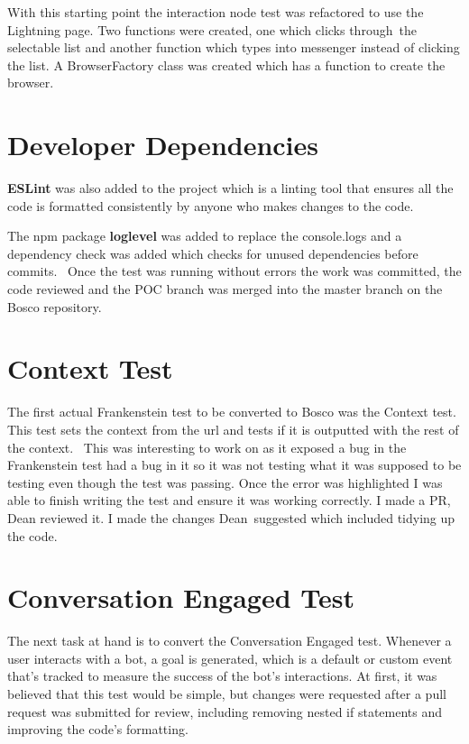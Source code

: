 \documentclass[12pt,a4paper,titlepage]{report}
\begin{document}
With this starting point the interaction node test was refactored to use the Lightning page. Two functions were
created, one which clicks through the selectable list and another function which types into messenger instead of
clicking the list. A BrowserFactory class was created which has a function to create the browser.

\section{Developer Dependencies}
\textbf {ESLint} was also added to the project which is a linting tool that ensures all the code is formatted consistently
by anyone who makes changes to the code.  

The npm package \textbf {loglevel} was added to replace the console.logs and a dependency check
was added which checks for unused dependencies before commits.  Once the test was running without errors the work
was committed, the code reviewed and the POC branch was merged into the master branch on the Bosco repository.


\section{Context Test}
The first actual Frankenstein test to be converted to Bosco was the Context test. This test sets the context from the url
and tests if it is outputted with the rest of the context.  This was interesting to work on as it exposed a bug in the Frankenstein test had a bug in it so it was not testing what it was supposed to be
testing even though the test was passing. Once the error was highlighted I was able to finish writing the test
and ensure it was working correctly. I made a PR, Dean reviewed it. I made the changes Dean suggested which
included tidying up the code.

\section{Conversation Engaged Test}
The next task at hand is to convert the Conversation Engaged test. Whenever a user interacts with a bot, a goal is generated, which is a default or custom event that's tracked to measure the success of the bot's interactions.
At first, it was believed that this test would be simple, but changes were requested after a pull request was submitted for review, including removing nested if statements and improving the code's formatting.
\end{document}
